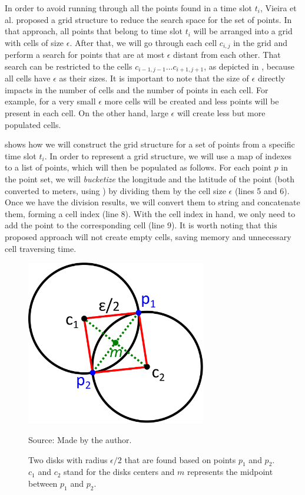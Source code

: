 In order to avoid running  through all the points found in a time slot $t_i$, Vieira et al.
\citep{vieira} proposed a grid structure to reduce the search space for the set of points. In that approach, all points
that belong to time slot $t_i$ will be arranged into a grid with cells of size $\epsilon$. After that, we will go
through each cell $c_{i,j}$ in the grid and perform a search for points that are at most $\epsilon$ distant from each
other. That search can be restricted to the cells $c_{i - 1, j - 1} ... c_{i + 1, j + 1}$, as depicted in
, because all cells have $\epsilon$ as their sizes. It is important to note that the size of $\epsilon$
directly impacts in the number of cells and the number of points in each cell. For example, for a very small $\epsilon$
more cells will be created and less points will be present in each cell. On the other hand, large $\epsilon$ will create
less but more populated cells.

 shows how we will construct the grid structure for a set of points from a specific time slot $t_i$.
In order to represent a grid structure, we will use a map of indexes to a list of points, which will then be populated
as follows. For each point $p$ in the point set, we will \textit{bucketize} the longitude and the latitude of the point
(both converted to meters, using ) by dividing them by the cell size $\epsilon$ (lines 5 and 6).
Once we have the division results, we will convert them to string and concatenate them, forming a cell index (line 8).
With the cell index in hand, we only need to add the point to the corresponding cell (line 9). It is worth noting that
this proposed approach will not create empty cells, saving memory and unnecessary cell traversing time.

\begin{figure}[h!]
    \centering
    \caption{Two disks with radius $\epsilon/2$ that are found based on points $p_1$ and $p_2$. $c_1$ and $c_2$ stand
        for the disks centers and $m$ represents the midpoint between $p_1$ and $p_2$.}
    \centerline{\includegraphics[width=0.7\textwidth]{images/disks_discovery.eps}}
    \footnotesize{Source: Made by the author.}
    \label{fig:disks_discovery}
\end{figure}

